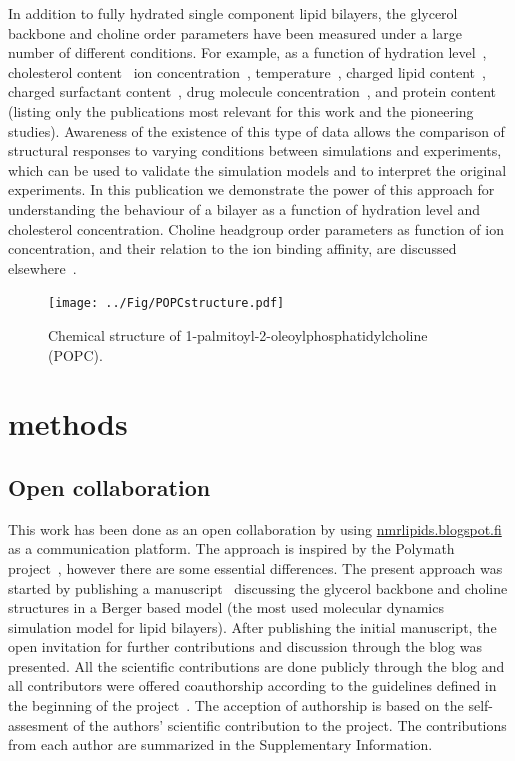 \documentclass[journal=jacsat,manuscript=article]{achemso}
\begin{document}
In addition to fully hydrated single component lipid bilayers, the glycerol backbone and choline order parameters
have been measured under a large number of different conditions. For example, as a function of hydration level~\cite{bechinger91,ulrich94,dvinskikh05b}, cholesterol content~\cite{brown78,ferreira13}
ion concentration~\cite{brown77,akutsu81,altenbach84,roux90,roux91}, temperature~\cite{gally75}, charged lipid content~\cite{roux90,roux91}, charged surfactant content~\cite{scherer89}, 
drug molecule concentration~\cite{browning82,kelusky84,castro08}, and protein content~\cite{roux89,kuchinka89} (listing only the publications most relevant for this work and the pioneering studies).
Awareness of the existence of this type of data allows the comparison of structural responses to varying conditions between simulations and experiments,
which can be used to validate the simulation models and to interpret the original experiments. 
In this publication we demonstrate the power of this approach for understanding the behaviour of a bilayer as a function of hydration level and cholesterol concentration.
Choline headgroup order parameters as function of ion concentration, and their relation to the ion binding affinity, are discussed elsewhere~\cite{ionpaper}.

  \begin{figure}[]
  \centering
  \texttt{[image: ../Fig/POPCstructure.pdf]}

  \caption{\label{POPCstructure}
    Chemical structure of  1-palmitoyl-2-oleoylphosphatidylcholine (POPC).}
  
\end{figure}

\section{methods}

\subsection{Open collaboration}

This work has been done as an open collaboration by using \url{nmrlipids.blogspot.fi}~\cite{nmrlipids}
as a communication platform.
The approach is inspired by the Polymath project~\cite{gowers09}, however there are some essential differences. 
The present approach was started by publishing a manuscript~\cite{ollila13} discussing the glycerol backbone and choline structures 
in a Berger based model (the most used molecular dynamics simulation model for lipid bilayers).
After publishing the initial manuscript, the open invitation for further contributions and discussion through the blog was presented.
All the scientific contributions are done publicly through the blog and all contributors were offered coauthorship
according to the guidelines defined in the beginning of the project~\cite{creditsPOST}.
The acception of authorship is based on the self-assesment of the authors' scientific contribution to the project.
The contributions from each author are summarized in the Supplementary Information. %
\end{document}
